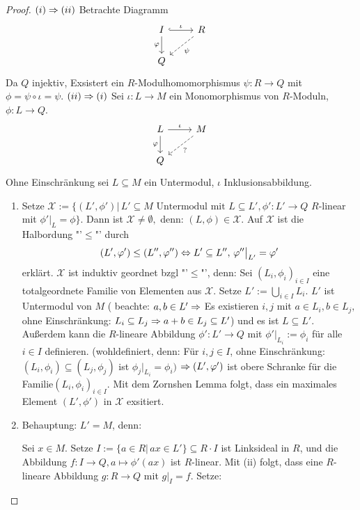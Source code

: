 \begin{proof}
	$(i) \Rightarrow (ii) $ Betrachte Diagramm
	$$\begin{tikzcd}
	I \arrow[hook]{r}{\iota}\arrow[swap]{d}{\phi} & R\arrow[dashed]{dl}{\psi} \\Q &
	\end{tikzcd}$$  Da $Q$ injektiv, Exsistert ein $R$-Modulhomomorphismus $\psi: R \to Q $ mit $ \phi = \psi \circ \iota = \psi$. 
	$(ii) \Rightarrow (i) $ Sei $\iota: L \to M $ ein Monomorphismus von $R$-Moduln, $\phi: L \to Q $.
	$$\begin{tikzcd}
	L \arrow{r}{\iota}\arrow[swap]{d}{\phi} & M\arrow[dashed]{dl}{?} \\Q &
	\end{tikzcd}$$ 
	 Ohne Einschränkung sei $L \subseteq M $ ein Untermodul, $\iota$ Inklusionsabbildung. 
	\begin{enumerate}
		\item Setze $\mathcal{X} := \{ (L',\phi')|\, L' \subseteq M \text{ Untermodul mit } L \subseteq L' , \phi': L' \to Q$ $R$-linear mit $\phi'\big|_L = \phi\}$. Dann ist $\mathcal{X} \neq \emptyset,$ denn: $ (L,\phi) \in \mathcal{X} $. Auf $\mathcal{X} $ ist die  Halbordung "'$\leq$"' durch $$ (L', \varphi') \leq (L'',\varphi'') \Leftrightarrow L' \subseteq L'',\, \varphi''\big|_{L'} = \varphi' $$ erklärt. $\mathcal{X} $ ist induktiv geordnet bzgl "'$\leq$"', denn: 
		Sei $ (L_i,\phi_i)_{i \in I } $ eine totalgeordnete Familie von Elementen aus $\mathcal{X}. $ Setze $ L' := \bigcup_{i \in I} L_i$. $L'$ ist Untermodul von $M$ ( beachte: $a,b \in L' \Rightarrow $ Es existieren $i,j$ mit $ a \in L_i, b \in L_j, $ohne Einschränkung: $ L_i \subseteq L_j  \Rightarrow a+b \in L_j \subseteq L' $) und es ist $L \subseteq L'.$ Außerdem kann die $R$-lineare Abbildung $\phi':L' \to Q $ mit $\phi'|_{L_i} := \phi_i $ für alle $i \in I $ definieren. (wohldefiniert, denn: Für $i,j \in I$, ohne Einschränkung: $(L_i,\phi_i) \subseteq (L_j, \phi_j) $ ist $\phi_j|_{L_i} = \phi _i)$ $\Rightarrow  (L',\varphi') $ ist obere Schranke für die Familie$(L_i,\phi_i)_{i \in I}. $ Mit dem Zornshen Lemma folgt, dass ein maximales Element $(L',\phi')$ in $\mathcal{X}$ exsitiert.
		\item Behauptung: $L' = M $, denn: \\
		\begin{minipage}[t]{0.7\textwidth}
		Sei $x \in M $. Setze $I:= \{a \in R|\, ax \in L'\} \subseteq R\cdot I $ ist Linksideal in $R$, und die Abbildung $f:I \to Q, a \mapsto \phi'(ax) $ ist $R$-linear. Mit (ii) folgt, dass eine $R$-lineare Abbildung $g:R \to Q $ mit $ g|_I=f. $ Setze:

\end{minipage}
\end{enumerate}
\end{proof}
